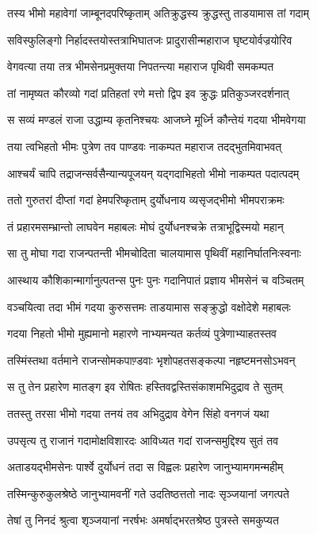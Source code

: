 \twolineshloka
{तस्य भीमो महावेगां जाम्बूनदपरिष्कृताम्}
{अतिक्रुद्धस्य क्रुद्धस्तु ताडयामास तां गदाम्}


\twolineshloka
{सविस्फुलिङ्गो निर्हादस्तयोस्तत्राभिघातजः}
{प्रादुरासीन्महाराज घृष्टयोर्वज्रयोरिव}


\twolineshloka
{वेगवत्या तया तत्र भीमसेनप्रमुक्तया}
{निपतन्त्या महाराज पृथिवी समकम्पत}


\twolineshloka
{तां नामृष्यत कौरव्यो गदां प्रतिहतां रणे}
{मत्तो द्विप इव क्रुद्धः प्रतिकुञ्जरदर्शनात्}


\twolineshloka
{स सव्यं मण्डलं राजा उद्धाम्य कृतनिश्चयः}
{आजघ्ने मूर्ध्नि कौन्तेयं गदया भीमवेगया}


\twolineshloka
{तया त्वभिहतो भीमः पुत्रेण तव पाण्डवः}
{नाकम्पत महाराज तदद्भुतमिवाभवत्}


\twolineshloka
{आश्चर्यं चापि तद्राजन्सर्वसैन्यान्यपूजयन्}
{यद्गदाभिहतो भीमो नाकम्पत पदात्पदम्}


\twolineshloka
{ततो गुरुतरां दीप्तां गदां हेमपरिष्कृताम्}
{दुर्योधनाय व्यसृजद्भीमो भीमपराक्रमः}


\twolineshloka
{तं प्रहारमसम्भ्रान्तो लाघवेन महाबलः}
{मोघं दुर्योधनश्चक्रे तत्राभूद्विस्मयो महान्}


\twolineshloka
{सा तु मोघा गदा राजन्पतन्ती भीमचोदिता}
{चालयामास पृथिवीं महानिर्घातनिःस्वनाः}


\twolineshloka
{आस्थाय कौशिकान्मार्गानुत्पतन्स पुनः पुनः}
{गदानिपातं प्रज्ञाय भीमसेनं च वञ्चितम्}


\twolineshloka
{वञ्चयित्वा तदा भीमं गदया कुरुसत्तमः}
{ताडयामास सङ्क्रुद्धो वक्षोदेशे महाबलः}


\twolineshloka
{गदया निहतो भीमो मुह्यमानो महारणे}
{नाभ्यमन्यत कर्तव्यं पुत्रेणाभ्याहतस्तव}


\twolineshloka
{तस्मिंस्तथा वर्तमाने राजन्सोमकपाण़्डवाः}
{भृशोपहतसङ्कल्पा नहृष्टमनसोऽभवन्}


\twolineshloka
{स तु तेन प्रहारेण मातङ्ग इव रोषितः}
{हस्तिवद्वस्तिसंकाशमभिदुद्राव ते सुतम्}


\twolineshloka
{ततस्तु तरसा भीमो गदया तनयं तव}
{अभिदुद्राव वेगेन सिंहो वनगजं यथा}


\twolineshloka
{उपसृत्य तु राजानं गदामोक्षविशारदः}
{आविध्यत गदां राजन्समुद्दिश्य सुतं तव}


\twolineshloka
{अताडयद्भीमसेनः पार्श्वे दुर्योधनं तदा}
{स विह्वलः प्रहारेण जानुभ्यामगमन्महीम्}


\twolineshloka
{तस्मिन्कुरुकुलश्रेष्ठे जानुभ्यामवनीं गते}
{उदतिष्ठत्ततो नादः सृञ्जयानां जगत्पते}


\twolineshloka
{तेषां तु निनदं श्रुत्वा शृञ्जयानां नरर्षभः}
{अमर्षाद्भरतश्रेष्ठ पुत्रस्ते समकुप्यत}


